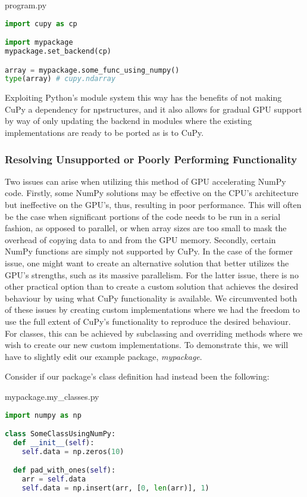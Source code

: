 \begin{center}
program.py
\end{center}
\begin{lstlisting}[language=Python,style=pycode]
import cupy as cp

import mypackage
mypackage.set_backend(cp)

array = mypackage.some_func_using_numpy()
type(array) # cupy.ndarray
\end{lstlisting}

Exploiting Python's module system this way has the benefits of not making CuPy a dependency for npstructures, and it also allows for gradual GPU support by way of only updating the backend in modules where the existing implementations are ready to be ported as is to CuPy.

\subsubsection{Resolving Unsupported or Poorly Performing Functionality}
Two issues can arise when utilizing this method of GPU accelerating NumPy code.
Firstly, some NumPy solutions may be effective on the CPU's architecture but ineffective on the GPU's, thus, resulting in poor performance.
This will often be the case when significant portions of the code needs to be run in a serial fashion, as opposed to parallel, or when array sizes are too small to mask the overhead of copying data to and from the GPU memory.
Secondly, certain NumPy functions are simply not supported by CuPy.
In the case of the former issue, one might want to create an alternative solution that better utilizes the GPU's strengths, such as its massive parallelism.
For the latter issue, there is no other practical option than to create a custom solution that achieves the desired behaviour by using what CuPy functionality is available.
We circumvented both of these issues by creating custom implementations where we had the freedom to use the full extent of CuPy's functionality to reproduce the desired behaviour.
For classes, this can be achieved by subclassing and overriding methods where we wish to create our new custom implementations.
To demonstrate this, we will have to slightly edit our example package, \textit{mypackage}.

Consider if our package's class definition had instead been the following:
\begin{center}
mypackage.my\_classes.py
\end{center}
\begin{lstlisting}[language=Python,style=pycode]
import numpy as np

class SomeClassUsingNumPy:
  def __init__(self):
    self.data = np.zeros(10)

  def pad_with_ones(self):
    arr = self.data
    self.data = np.insert(arr, [0, len(arr)], 1)
\end{lstlisting}

